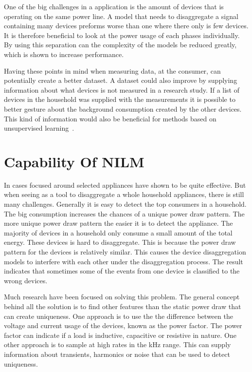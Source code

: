 One of the big challenges in a  application is the amount of devices that is operating on the same power line. A model that needs to disaggregate a signal containing many devices preforms worse than one where there only is few devices. It is therefore beneficial to look at the power usage of each phases individually. By using this separation can the complexity of the models be reduced greatly, which is shown to increase performance. 

Having these points in mind when measuring data, at the consumer, can potentially create a better dataset. A dataset could also improve by supplying information about what devices is not measured in a research study. If a list of devices in the household was supplied with the measurements it is possible to better gesture about the background consumption created by the other devices. This kind of information would also be beneficial for methods based on unsupervised learning~\citep{RefWorks:19}. 

\section{Capability Of NILM}
In cases focused around selected appliances have  shown to be quite effective. But when seeing  as a tool to disaggregate a whole household appliances, there is still many challenges. Generally it is easy to detect the top consumers in a household. The big consumption increases the chances of a unique power draw pattern. The more unique power draw pattern the easier it is to detect the appliance. The majority of devices in a household only consume a small amount of the total energy. These devices is hard to disaggregate. This is because the power draw pattern for the devices is relatively similar. This causes the device disaggregation models to interfere with each other under the disaggregation process. The result indicates that sometimes some of the events from one device is classified to the wrong devices. 

Much research have been focused on solving this problem. The general concept behind all the solution is to find other features than the static power draw that can create uniqueness. One approach is to use the the difference between the voltage and current usage of the devices, known as the power factor. The power factor can indicate if a load is inductive, capacitive or resistive in nature. One other approach is to sample at high rates in the kHz range. This can supply information about transients, harmonics or noise that can be used to detect uniqueness.

